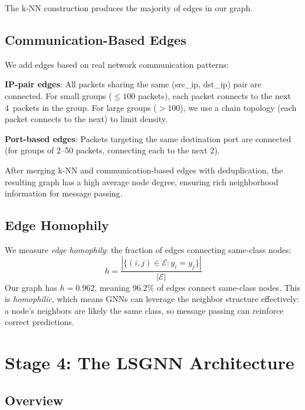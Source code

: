 \documentclass[conference]{IEEEtran}
\newcommand{\E}{\mathcal{E}}
\begin{document}
The k-NN construction produces the majority of edges in our graph.

\subsection{Communication-Based Edges}

We add edges based on real network communication patterns:

\textbf{IP-pair edges}: All packets sharing the same (src\_ip, dst\_ip) pair are connected. For small groups ($\leq 100$ packets), each packet connects to the next 4~packets in the group. For large groups ($> 100$), we use a chain topology (each packet connects to the next) to limit density.

\textbf{Port-based edges}: Packets targeting the same destination port are connected (for groups of 2--50 packets, connecting each to the next 2).

After merging k-NN and communication-based edges with deduplication, the resulting graph has a high average node degree, ensuring rich neighborhood information for message passing.

\subsection{Edge Homophily}

We measure \emph{edge homophily}: the fraction of edges connecting same-class nodes:
\begin{equation}
    h = \frac{|\{(i,j) \in \E : y_i = y_j\}|}{|\E|}
\end{equation}
Our graph has $h = 0.962$, meaning 96.2\% of edges connect same-class nodes. This is \emph{homophilic}, which means GNNs can leverage the neighbor structure effectively: a node's neighbors are likely the same class, so message passing can reinforce correct predictions.

\section{Stage 4: The LSGNN Architecture}
\label{sec:lsgnn}

\subsection{Overview}
\end{document}
